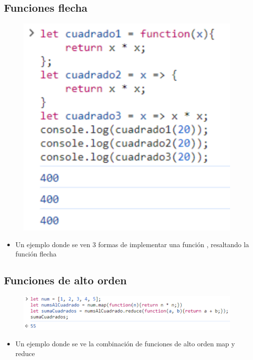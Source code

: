 \documentclass{article}
\begin{document}
	\subsection{Funciones flecha}
	\begin{figure}[H]
		\centering
		\includegraphics[width=1.0\textwidth,keepaspectratio]{img/FuncionesFlecha.PNG}
	\end{figure}
	\begin{itemize}
		\item Un ejemplo donde se ven 3 formas de implementar una función , resaltando la función flecha
	\end{itemize}
	\clearpage
	\subsection{Funciones de alto orden}
	\begin{figure}[H]
		\centering
		\includegraphics[width=1.0\textwidth,keepaspectratio]{img/FuncionDeAltoOrden.PNG}
	\end{figure}
	\begin{itemize}
		\item Un ejemplo donde se ve la combinación de funciones de alto orden map y reduce
	\end{itemize}  
\end{document}

